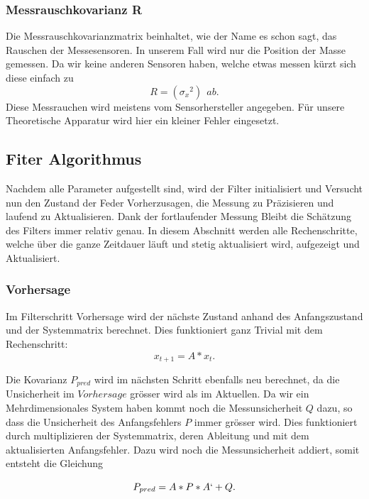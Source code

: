 \documentclass[11pt,a4paper]{article}
\begin{document}
\subsubsection*{Messrauschkovarianz R}
Die Messrauschkovarianzmatrix beinhaltet, wie der Name es schon sagt, das Rauschen der Messesensoren. In unserem Fall wird nur die Position der Masse gemessen. Da wir keine anderen Sensoren haben, welche etwas messen kürzt sich diese einfach zu
\begin{equation}
R= ({\sigma_x }^2)\: \: ab.
\end{equation} 
Diese Messrauchen wird meistens vom Sensorhersteller angegeben. Für unsere Theoretische Apparatur wird hier ein kleiner Fehler eingesetzt.

\subsection{Fiter Algorithmus}
Nachdem alle Parameter aufgestellt sind, wird der Filter initialisiert und Versucht nun den Zustand der Feder Vorherzusagen, die Messung zu Präzisieren und laufend zu Aktualisieren. Dank der fortlaufender Messung Bleibt die Schätzung des Filters immer relativ genau. In diesem Abschnitt werden alle Rechenschritte, welche über die ganze Zeitdauer läuft und stetig aktualisiert wird, aufgezeigt und Aktualisiert.


\subsubsection*{Vorhersage}
Im Filterschritt Vorhersage wird der nächste Zustand anhand des Anfangszustand und der Systemmatrix berechnet. Dies funktioniert ganz Trivial mit dem Rechenschritt:
\begin{equation}
{x_{t+1}}=A*{x_t}.
\end{equation} 


Die Kovarianz $P_{pred}$ wird im nächsten Schritt ebenfalls neu berechnet, da die Unsicherheit im $Vorhersage$ grösser wird als im Aktuellen. Da wir ein Mehrdimensionales System haben kommt noch die Messunsicherheit $Q$ dazu, so dass die Unsicherheit des Anfangsfehlers $P$ immer grösser wird. Dies funktioniert durch multiplizieren der Systemmatrix, deren Ableitung und mit dem aktualisierten Anfangsfehler. Dazu wird noch die Messunsicherheit addiert, somit entsteht die Gleichung


\begin{equation}
{P_{pred}}=A*P*A`+Q.
\end{equation}
\end{document}
